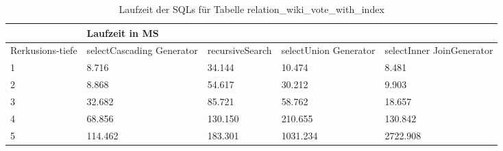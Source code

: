 \begin{table}[H]
	\centering
	\begin{tabular}{l|l|l|l|l|l|}
		\cline{2-6}
		& \multicolumn{5}{|l|}{Laufzeit in MS}                                                                                                                                                  \\ \hline
		\multicolumn{1}{|l|}{\multirow{2}{2cm}{Rerkusions-tiefe}} & \multicolumn{2}{|l|}{\multirow{2}{3cm}{selectCascading Generator}} & \multirow{2}{2.8cm}{recursiveSearch} & \multirow{2}{2.5cm}{selectUnion Generator} & \multirow{2}{2.5cm}{selectInner JoinGenerator} \\
		\multicolumn{1}{|l|}{}
		& \multicolumn{2}{|l|}{}                                           &                                  &                                     &                                           \\ \hline
		
	\multicolumn{1}{|l|}{1}                                 & \multicolumn{2}{l|}{8.716}                                       & 34.144                                                & 10.474                                                    & 8.481                                                           \\ \hline
	\multicolumn{1}{|l|}{2}                                 & \multicolumn{2}{l|}{8.868}                                       & 54.617                                                & 30.212                                                    & 9.903                                                           \\ \hline
	\multicolumn{1}{|l|}{3}                                 & \multicolumn{2}{l|}{32.682}                                      & 85.721                                                & 58.762                                                    & 18.657                                                          \\ \hline
	\multicolumn{1}{|l|}{4}                                 & \multicolumn{2}{l|}{68.856}                                      & 130.150                                               & 210.655                                                   & 130.842                                                         \\ \hline
	\multicolumn{1}{|l|}{5}                                 & \multicolumn{2}{l|}{114.462}                                     & 183.301                                               & 1031.234                                                  & 2722.908                                                        \\ \hline
	
	\end{tabular}
	\caption{Laufzeit der SQLs für Tabelle relation\_wiki\_vote\_with\_index}
	\label{2.relationwikivoteindex.table}
\end{table}

